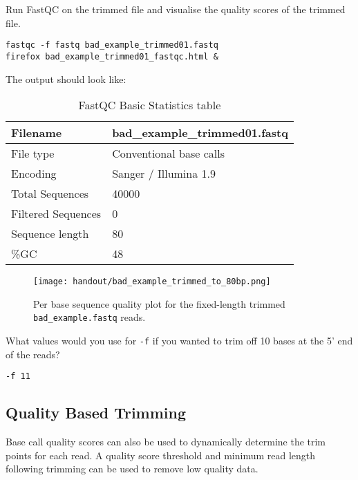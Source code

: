 \begin{steps}
Run FastQC on the trimmed file and visualise the quality scores of the trimmed file.
\begin{lstlisting}
fastqc -f fastq bad_example_trimmed01.fastq
firefox bad_example_trimmed01_fastqc.html &
\end{lstlisting}

The output should look like:

\begin{table}[H]
  \centering
  \caption{FastQC Basic Statistics table}
    \begin{tabular}{ll}
    \toprule
    Filename & bad\_example\_trimmed01.fastq\\
    \midrule
     File type & Conventional base calls\\
     Encoding & Sanger / Illumina 1.9\\
     Total Sequences & 40000\\
     Filtered Sequences & 0\\
     Sequence length & 80\\
    \%GC & 48\\
    \bottomrule
    \end{tabular}
  \label{tab:badexampletrimmed}
\end{table}

\begin{figure}[H]
\centering
\texttt{[image: handout/bad\_example\_trimmed\_to\_80bp.png]}
\caption{Per base sequence quality plot for the fixed-length trimmed \texttt{bad\_example.fastq} reads.}
\label{fig:bad_example_trimmed_plot}
\end{figure}

\end{steps}

\begin{questions}
What values would you use for \texttt{-f} if you wanted to trim off 10 bases at
the 5' end of the reads?
\begin{answer}
\texttt{-f 11}
\end{answer}
\end{questions}

\subsection{Quality Based Trimming}
Base call quality scores can also be used to dynamically determine the trim
points for each read. A quality score threshold and minimum read length
following trimming can be used to remove low quality data.

